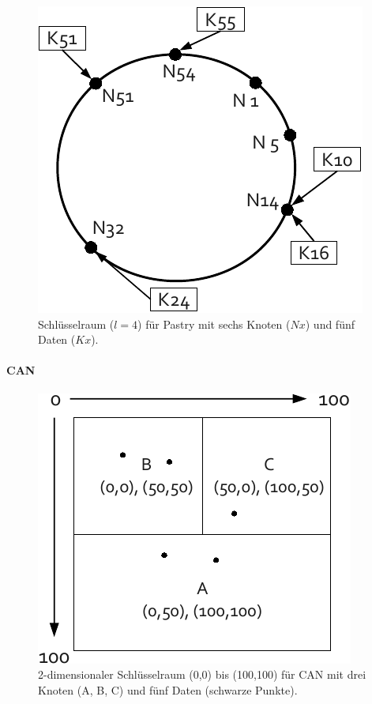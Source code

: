\begin{figure}[htb]
\centering
\includegraphics{grafics/pastry_key_space.pdf}
\caption{Schlüsselraum ($l=4$) für Pastry mit sechs Knoten ($Nx$) und fünf Daten ($Kx$).}
\label{fig:pastry_key_space}
\end{figure}


\paragraph{CAN}

\begin{figure}[htb]
\centering
\includegraphics{grafics/can_key_space.pdf}
\caption{2-dimensionaler Schlüsselraum (0,0) bis (100,100) für CAN mit drei Knoten (A, B, C) und fünf Daten (schwarze Punkte).}
\label{fig:can_key_space}
\end{figure}


